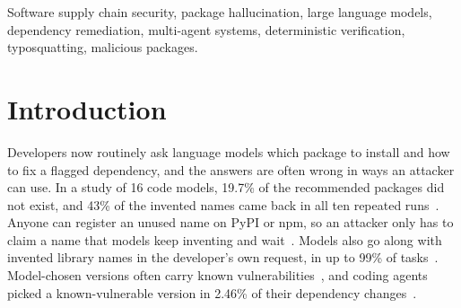 \documentclass[conference]{IEEEtran}
\begin{document}
\begin{abstract}
Developers now often ask a language model what to do when a scanner flags one of their dependencies. As far as we
know, no one has checked whether that advice is safe, or whether the reasons given for it are true. We built a
five-agent pipeline to find out. Only one agent uses a language model, and a separate, deterministic Verification
Agent checks every claim and every recommended package against a time-stamped evidence store. We tested three open
models with 3 to 8 billion parameters, run locally, on 298 held-out test cases from five label families. Even with
the evidence in their prompt, the models left 4--66\% of their claims on vulnerable and typosquat cases unsupported,
and the two 3B models gave an unsafe action or target in 26--61\% of their answers on malicious and typosquat cases.
Without a cut-off, the verifier stopped all 100 unsafe recommendations and wrongly rejected only 5 of 396 acceptable
ones, but it left many cases with no advice at all. A simple rule-based recommender was just as safe and covered
more cases in most families. When we hid evidence published after a cut-off date, the only vulnerable targets that
slipped through were those whose advisories appeared later.
\end{abstract}

\begin{IEEEkeywords}
Software supply chain security, package hallucination, large language models, dependency remediation,
multi-agent systems, deterministic verification, typosquatting, malicious packages.
\end{IEEEkeywords}

\section{Introduction}

Developers now routinely ask language models which package to install and how to fix a flagged dependency, and
the answers are often wrong in ways an attacker can use. In a
study of 16 code models, 19.7\% of the recommended packages did not exist, and 43\% of the invented names came back
in all ten repeated runs~\cite{spracklen2025}. Anyone can register an unused name on PyPI or npm, so an attacker only has to
claim a name that models keep inventing and wait~\cite{spracklen2025,raj2026}.
Models also go along with invented library names in the developer's own request, in up to 99\% of
tasks~\cite{twist2026}. Model-chosen versions often carry known vulnerabilities~\cite{wang2026}, and coding agents picked a known-vulnerable version in 2.46\% of their dependency changes~\cite{singla2026}.
\end{document}
